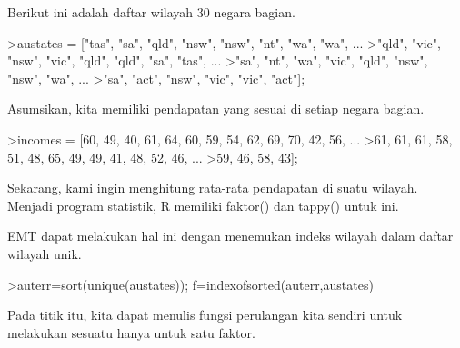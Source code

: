 \documentclass[a4paper,10pt]{article}
\begin{document}
\begin{eulernotebook}
\begin{eulercomment}
\begin{eulercomment}
\begin{eulercomment}
\begin{eulercomment}
\begin{eulercomment}
\begin{eulercomment}
\begin{eulercomment}
Berikut ini adalah daftar wilayah 30 negara bagian.
\end{eulercomment}
\begin{eulerprompt}
>austates = ["tas", "sa", "qld", "nsw", "nsw", "nt", "wa", "wa", ...
>"qld", "vic", "nsw", "vic", "qld", "qld", "sa", "tas", ...
>"sa", "nt", "wa", "vic", "qld", "nsw", "nsw", "wa", ...
>"sa", "act", "nsw", "vic", "vic", "act"];
\end{eulerprompt}
\begin{eulercomment}
Asumsikan, kita memiliki pendapatan yang sesuai di setiap negara
bagian.
\end{eulercomment}
\begin{eulerprompt}
>incomes = [60, 49, 40, 61, 64, 60, 59, 54, 62, 69, 70, 42, 56, ...
>61, 61, 61, 58, 51, 48, 65, 49, 49, 41, 48, 52, 46, ...
>59, 46, 58, 43];
\end{eulerprompt}
\begin{eulercomment}
Sekarang, kami ingin menghitung rata-rata pendapatan di suatu wilayah.
Menjadi program statistik, R memiliki faktor() dan tappy() untuk ini.

EMT dapat melakukan hal ini dengan menemukan indeks wilayah dalam
daftar wilayah unik.
\end{eulercomment}
\begin{eulerprompt}
>auterr=sort(unique(austates)); f=indexofsorted(auterr,austates)
\end{eulerprompt}
\begin{euleroutput}
  [6,  5,  4,  2,  2,  3,  8,  8,  4,  7,  2,  7,  4,  4,  5,  6,  5,  3,
  8,  7,  4,  2,  2,  8,  5,  1,  2,  7,  7,  1]
\end{euleroutput}
\begin{eulercomment}
Pada titik itu, kita dapat menulis fungsi perulangan kita sendiri
untuk melakukan sesuatu hanya untuk satu faktor.


\end{eulercomment}
\end{eulercomment}
\end{eulercomment}
\end{eulercomment}
\end{eulercomment}
\end{eulercomment}
\end{eulercomment}
\end{eulernotebook}
\end{document}
